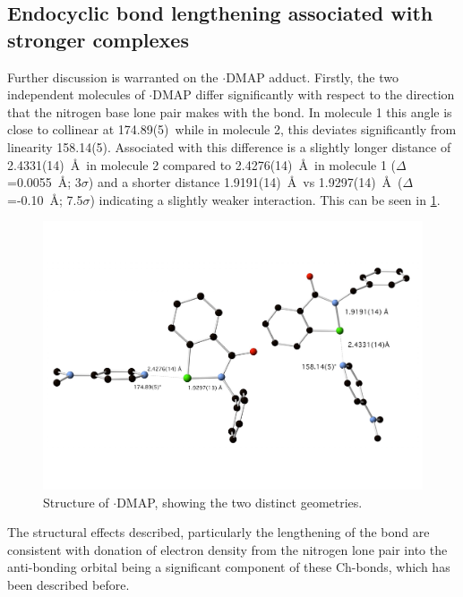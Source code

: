 \begin{refsection}
    \subsection{Endocyclic bond lengthening associated with stronger complexes}
    Further discussion is warranted on the $ \cdot $DMAP adduct.
    Firstly, the two independent molecules of $ \cdot $DMAP differ significantly with respect to the direction that the nitrogen base lone pair makes with the  bond.
    In molecule 1 this angle is close to collinear at 174.89(5)\degree\ while in molecule 2, this deviates significantly from linearity 158.14(5)\degree.
    Associated with this difference is a slightly longer  distance of 2.4331(14)~\AA\ in molecule 2 compared to 2.4276(14)~\AA\ in molecule 1 ($ \Delta $=0.0055~\AA{}; 3$ \sigma $) and a shorter  distance 1.9191(14)~\AA\ vs 1.9297(14)~\AA\ ($ \Delta $=-0.10~\AA{}; 7.5$ \sigma $) indicating a slightly weaker interaction.
    This can be seen in \cref{fig:benzyl-dmap-xray-2}.
    
    \begin{figure}
      \centering
      \includegraphics[width=0.8\linewidth]{Figures/benzyl-dmap-xray-2.pdf}
      \caption{Structure of $ \cdot $DMAP, showing the two distinct geometries.}\label{fig:benzyl-dmap-xray-2}
    \end{figure}
    
    The structural effects described, particularly the lengthening of the  bond are consistent with donation of electron density from the nitrogen lone pair into the  anti-bonding orbital being a significant component of these  Ch-bonds, which has been described before\autocite{Pascoe2017}.
    

\end{refsection}
